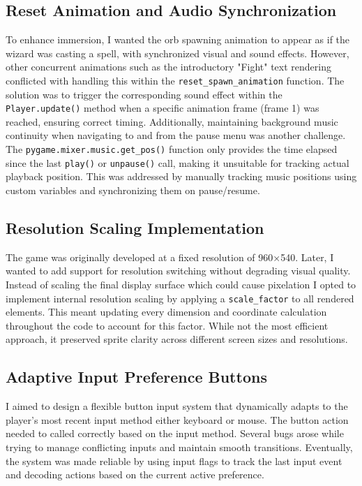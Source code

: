\documentclass[10.5pt]{article}
\begin{document}
\subsection{Reset Animation and Audio Synchronization}
To enhance immersion, I wanted the orb spawning animation to appear as if the wizard was casting a spell, with synchronized visual and sound effects. However, other concurrent animations such as the introductory "Fight" text rendering conflicted with handling this within the \texttt{reset\_spawn\_animation} function. The solution was to trigger the corresponding sound effect within the \texttt{Player.update()} method when a specific animation frame (frame 1) was reached, ensuring correct timing.  
Additionally, maintaining background music continuity when navigating to and from the pause menu was another challenge. The \texttt{pygame.mixer.music.get\_pos()} function only provides the time elapsed since the last \texttt{play()} or \texttt{unpause()} call, making it unsuitable for tracking actual playback position. This was addressed by manually tracking music positions using custom variables and synchronizing them on pause/resume.

\subsection{Resolution Scaling Implementation}
The game was originally developed at a fixed resolution of 960×540. Later, I wanted to add support for resolution switching without degrading visual quality. Instead of scaling the final display surface which could cause pixelation I opted to implement internal resolution scaling by applying a \texttt{scale\_factor} to all rendered elements. This meant updating every dimension and coordinate calculation throughout the code to account for this factor. While not the most efficient approach, it preserved sprite clarity across different screen sizes and resolutions.

\subsection{Adaptive Input Preference Buttons}
I aimed to design a flexible button input system that dynamically adapts to the player's most recent input method either keyboard or mouse. The button action needed to called correctly based on the input method. Several bugs arose while trying to manage conflicting inputs and maintain smooth transitions. Eventually, the system was made reliable by using input flags to track the last input event and decoding actions based on the current active preference.
\end{document}
